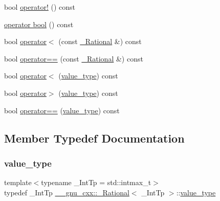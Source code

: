 \begin{DoxyCompactItemize}
\item 
bool \hyperlink{class____gnu__cxx_1_1__Rational_ac0d87507d12c6e6e4eed1a18266d943f}{operator!} () const
\item 
\hyperlink{class____gnu__cxx_1_1__Rational_adc0caeeff41f07a42ba9982140bc8a17}{operator bool} () const
\item 
bool \hyperlink{class____gnu__cxx_1_1__Rational_abd487c691d4b16d528258d23bb3f816e}{operator$<$} (const \hyperlink{class____gnu__cxx_1_1__Rational}{\+\_\+\+Rational} \&) const
\item 
bool \hyperlink{class____gnu__cxx_1_1__Rational_a7cfe2368fdb19305ca4d7b2eedcd90a4}{operator==} (const \hyperlink{class____gnu__cxx_1_1__Rational}{\+\_\+\+Rational} \&) const
\item 
bool \hyperlink{class____gnu__cxx_1_1__Rational_ab2019882eedea220001990047d4025bb}{operator$<$} (\hyperlink{class____gnu__cxx_1_1__Rational_a7987be70fc59d0d980621fd65828b74a}{value\+\_\+type}) const
\item 
bool \hyperlink{class____gnu__cxx_1_1__Rational_ae2a1d9fc6a2368b1f89e8d55424738f6}{operator$>$} (\hyperlink{class____gnu__cxx_1_1__Rational_a7987be70fc59d0d980621fd65828b74a}{value\+\_\+type}) const
\item 
bool \hyperlink{class____gnu__cxx_1_1__Rational_aad08ed01c44597de5ac944b4d11f1d44}{operator==} (\hyperlink{class____gnu__cxx_1_1__Rational_a7987be70fc59d0d980621fd65828b74a}{value\+\_\+type}) const
\end{DoxyCompactItemize}


\subsection{Member Typedef Documentation}
\mbox{\label{class____gnu__cxx_1_1__Rational_a7987be70fc59d0d980621fd65828b74a}} 
\subsubsection{\texorpdfstring{value\+\_\+type}{value\_type}}
{\footnotesize\ttfamily template$<$typename \+\_\+\+Int\+Tp = std\+::intmax\+\_\+t$>$ \\
typedef \+\_\+\+Int\+Tp \hyperlink{class____gnu__cxx_1_1__Rational}{\+\_\+\+\_\+gnu\+\_\+cxx\+::\+\_\+\+Rational}$<$ \+\_\+\+Int\+Tp $>$\+::\hyperlink{class____gnu__cxx_1_1__Rational_a7987be70fc59d0d980621fd65828b74a}{value\+\_\+type}}



